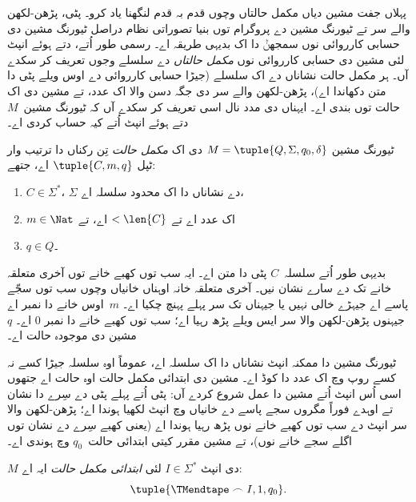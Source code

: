 \documentclass[../../../include/open-logic-section]{subfiles}
\begin{document}

\begin{explain}
پہلاں جفت مشین دیاں مکمل
حالتاں وچوں قدم بہ قدم
لنگھنا یاد کرو۔ پٹی،
پڑھن-لکھن والے سر تے
ٹیورنگ مشین دے پروگرام
توں بنیا تصوراتی نظام
دراصل ٹیورنگ مشین دی
حسابی کارروائی نوں سمجھݨ
دا اک بدیہی طریقہ اے۔
رسمی طور اُتے، دتے ہوئے
انپٹ لئی مشین دی حسابی
کارروائی نوں
\emph{مکمل حالتاں} دے سلسلے
وجوں تعریف کر سکدے آں۔
ہر مکمل حالت نشاناں
دے اک سلسلے (جیڑا
حسابی کارروائی دے اوس
ویلے پٹی دا متن دکھاندا
اے)، پڑھن-لکھن والے
سر دی جگہ دسن والا
اک عدد، تے مشین دی
اک حالت توں بندی اے۔ ایہناں دی
مدد نال اسی تعریف کر
سکدے آں کہ ٹیورنگ
مشین~$M$ دتے ہوئے
انپٹ اُتے کیہ حساب
کردی اے۔
\end{explain}

\begin{defn}
ٹیورنگ مشین $M = \tuple{Q, \Sigma, q_0,
\delta}$ دی اک \emph{مکمل حالت}
تِن رکناں دا ترتیب وار
ٹپل $\tuple{C, m, q}$ اے،
جتھے:
\begin{enumerate}
\item $C \in \Sigma^*$، $\Sigma$
  دے نشاناں دا اک محدود
  سلسلہ اے،
\item $m \in \Nat$ اک عدد اے
  تے $< \len{C}$ اے، تے
\item $q \in Q$۔
\end{enumerate}
بدیہی طور اُتے سلسلہ~$C$
پٹی دا متن اے۔ ایہ سب توں کھبے خانے توں
آخری متعلقہ خانے تک دے سارے نشان نیں۔ آخری
متعلقہ خانہ اوہناں خانیاں وچوں سب توں سجّے پاسے اے
جیہڑے خالی نہیں یا جیہناں تک سر پہلے پہنچ چکیا اے۔ $m$~اوس
خانے دا نمبر اے جیہنوں
پڑھن-لکھن والا سر
ایس ویلے پڑھ رہیا اے؛
سب توں کھبے خانے دا
نمبر $0$ اے۔ $q$ مشین دی
موجودہ حالت اے۔
\end{defn}

\begin{explain}
ٹیورنگ مشین دا ممکنہ
انپٹ نشاناں دا اک سلسلہ
اے، عموماً اوہ سلسلہ
جیڑا کسے نہ کسے روپ
وچ اک عدد دا کوڈ اے۔ مشین دی
ابتدائی مکمل حالت
اوہ حالت اے جتھوں اسی
اُس انپٹ اُتے مشین
دا عمل شروع کردے آں:
پٹی اُتے پہلے پٹی دے
سِرے دا نشان تے اوہدے
فوراً مگروں سجے پاسے
دے خانیاں وچ انپٹ
لکھیا ہوندا اے؛
پڑھن-لکھن والا سر
انپٹ دے سب توں کھبے
خانے نوں پڑھ رہیا
ہوندا اے (یعنی کھبے
سِرے دے نشان توں
اگلے سجے خانے نوں)،
تے مشین مقرر کیتی
ابتدائی حالت~$q_0$
وچ ہوندی اے۔
\end{explain}

\begin{defn}
$M$ دی انپٹ $I \in \Sigma^*$
لئی \emph{ابتدائی مکمل
حالت} ایہ اے:
\[
\tuple{\TMendtape \frown I, 1, q_0}.
\]
\end{defn}
\end{document}
